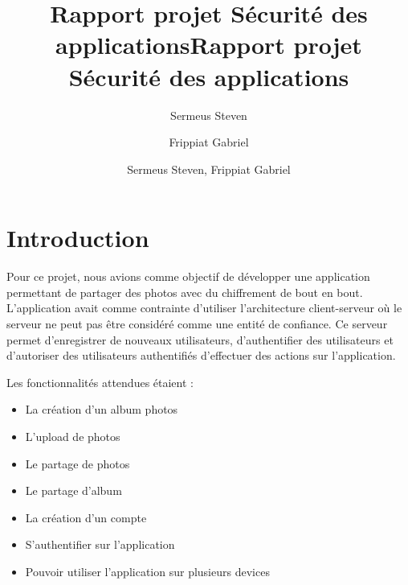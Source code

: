 \documentclass[
  11pt,
  paper=a4,
  ,captions=tableheading
]{scrartcl}
\title{Rapport projet Sécurité des applications}
\author{Sermeus Steven \and Frippiat Gabriel}
\date{}
\title{Rapport projet Sécurité des applications}
\author{Sermeus Steven, Frippiat Gabriel}
\date{}
\providecommand{\tightlist}{%
  \setlength{\itemsep}{0pt}\setlength{\parskip}{0pt}}
\begin{document}
\begin{titlepage}
\newcommand{\colorRule}[3][black]{\textcolor[HTML]{#1}{\rule{#2}{#3}}}
\end{titlepage}
\restoregeometry




\newpage

\renewcommand{\contentsname}{Table des matières}

\tableofcontents
\newpage

\hypertarget{introduction}{%
\section{Introduction}\label{introduction}}

Pour ce projet, nous avions comme objectif de développer une application
permettant de partager des photos avec du chiffrement de bout en bout.
L’application avait comme contrainte d’utiliser l’architecture
client-serveur où le serveur ne peut pas être considéré comme une entité
de confiance. Ce serveur permet d’enregistrer de nouveaux utilisateurs,
d’authentifier des utilisateurs et d’autoriser des utilisateurs
authentifiés d’effectuer des actions sur l’application.

Les fonctionnalités attendues étaient :

\begin{itemize}
\tightlist
\item
  La création d’un album photos
\item
  L’upload de photos
\item
  Le partage de photos
\item
  Le partage d’album
\item
  La création d’un compte
\item
  S’authentifier sur l’application
\item
  Pouvoir utiliser l’application sur plusieurs devices
\end{itemize}
\end{document}
